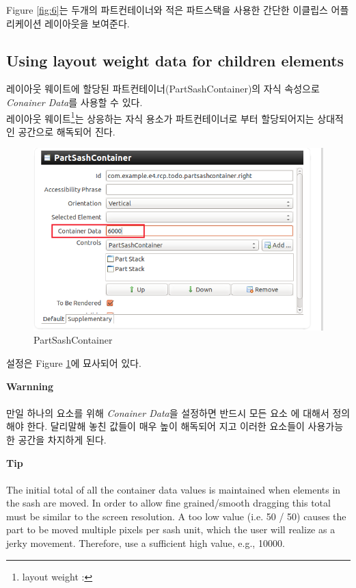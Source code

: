 Figure \ref{fig:6}는 두개의 파트컨테이너와 적은 파트스택을 사용한 간단한 이클립스 어플리케이션 레이아웃을 보여준다. \\

\subsection{Using layout weight data for children elements}
레이아웃 웨이트에 할당된 파트컨테이너(PartSashContainer)의 자식 속성으로 \textit{Conainer Data}를 사용할 수 있다. \\

레이아웃 웨이트\footnote{layout weight : }는 상응하는 자식 용소가 파트컨테이너로 부터 할당되어지는 상대적인 공간으로 해독되어 진다. \\

\begin{figure}[hb]
\centering
\includegraphics[scale=.50]{./image/e4_008}
\captionsetup{justification=centering}
\caption{PartSashContainer}
\label{fig:7}       %
\end{figure}

설정은 Figure \ref{fig:7}에 묘사되어 있다. \\

\begin{svgraybox}
	\textbf{Warnning} \\ \\
	만일 하나의 요소를 위해 \textit{Conainer Data}을 설정하면 반드시 모든 요소		에 대해서 정의 해야 한다. 달리말해 놓친 값들이 매우 높이 해독되어 지고 이러한 		요소들이 사용가능한 공간을 차지하게 된다.
\end{svgraybox}

\begin{svgraybox}
	\textbf{Tip} \\ \\
	The initial total of all the container data values is maintained 		when elements in the sash are moved. In order to allow fine 			grained/smooth dragging this total must be similar to the screen 		resolution. A too low value (i.e. 50 / 50) causes the part to be 		moved multiple pixels per sash unit, which the user will realize 		as a jerky movement. Therefore, use a sufficient high value, e.g., 	10000.
\end{svgraybox}

